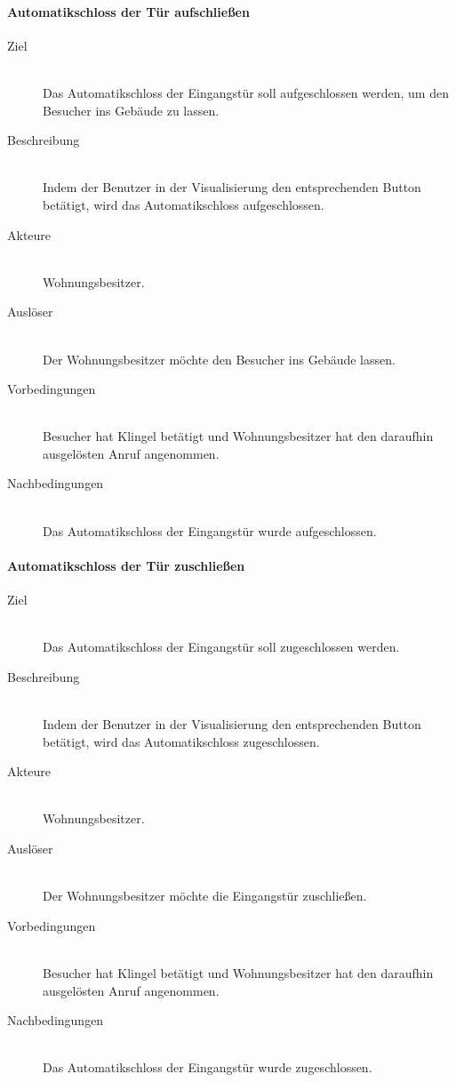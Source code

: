 \paragraph{Automatikschloss der Tür aufschließen}
    \begin{description}
        \item[Ziel]\hfill \\
        Das Automatikschloss der Eingangstür soll aufgeschlossen werden, um den Besucher ins Gebäude zu lassen.
        \item[Beschreibung]\hfill \\
        Indem der Benutzer in der Visualisierung den entsprechenden Button betätigt, wird das Automatikschloss aufgeschlossen.
        \item[Akteure]\hfill \\
        Wohnungsbesitzer.
        \item[Auslöser]\hfill \\
        Der Wohnungsbesitzer möchte den Besucher ins Gebäude lassen.
        \item[Vorbedingungen]\hfill \\
        Besucher hat Klingel betätigt und Wohnungsbesitzer hat den daraufhin ausgelösten Anruf angenommen.
        \item[Nachbedingungen]\hfill \\
        Das Automatikschloss der Eingangstür wurde aufgeschlossen.
        \end{description}

\paragraph{Automatikschloss der Tür zuschließen}
    \begin{description}
        \item[Ziel]\hfill \\
        Das Automatikschloss der Eingangstür soll zugeschlossen werden.
        \item[Beschreibung]\hfill \\
        Indem der Benutzer in der Visualisierung den entsprechenden Button betätigt, wird das Automatikschloss zugeschlossen.
        \item[Akteure]\hfill \\
        Wohnungsbesitzer.
        \item[Auslöser]\hfill \\
        Der Wohnungsbesitzer möchte die Eingangstür zuschließen.
        \item[Vorbedingungen]\hfill \\
        Besucher hat Klingel betätigt und Wohnungsbesitzer hat den daraufhin ausgelösten Anruf angenommen.
        \item[Nachbedingungen]\hfill \\
        Das Automatikschloss der Eingangstür wurde zugeschlossen.
        \end{description}

